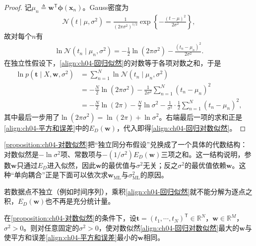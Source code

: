 \documentclass[../../main.tex]{subfiles}
\begin{document}
\begin{proof}
记$\mu_n\triangleq\boldsymbol{w}^{\mathsf{T}}\boldsymbol{\phi}(\boldsymbol{x}_n)$。Gauss密度为
\begin{align*}
  \mathcal{N}(t\mid\mu,\sigma^2)=\frac{1}{(2\pi\sigma^2)^{1/2}}\exp\left\{-\frac{(t-\mu)^2}{2\sigma^2}\right\},
\end{align*}
故对每个$n$有
\begin{align*}
  \ln\mathcal{N}(t_n\mid\mu_n,\sigma^2)=-\frac{1}{2}\ln(2\pi\sigma^2)-\frac{(t_n-\mu_n)^2}{2\sigma^2}.
\end{align*}
在独立性假设下，\eqref{align:ch04-回归似然}的对数等于各项对数之和，于是
\begin{align*}
  \ln p(\boldsymbol{t}\mid X,\boldsymbol{w},\sigma^2)
  &=\sum_{n=1}^{N}\ln\mathcal{N}(t_n\mid\mu_n,\sigma^2)\\
  &=-\frac{N}{2}\ln(2\pi\sigma^2)-\frac{1}{2\sigma^2}\sum_{n=1}^{N}(t_n-\mu_n)^2\\
  &=-\frac{N}{2}\ln(2\pi)-\frac{N}{2}\ln\sigma^2-\frac{1}{\sigma^2}\cdot\frac{1}{2}\sum_{n=1}^{N}(t_n-\mu_n)^2,
\end{align*}
其中最后一步用了$\ln(2\pi\sigma^2)=\ln(2\pi)+\ln\sigma^2$。右端最后一项的求和正是\eqref{align:ch04-平方和误差}中的$E_D(\boldsymbol{w})$，代入即得\eqref{align:ch04-回归对数似然}。
\end{proof}

\begin{remark}
\cref{proposition:ch04-对数似然}把“独立同分布假设”兑换成了一个具体的代数结构：对数似然是$-\ln\sigma^2$项、常数项与$-(1/\sigma^2)E_D(\boldsymbol{w})$三项之和。这一结构说明，参数$\boldsymbol{w}$只通过$E_D$进入似然，因此$\boldsymbol{w}$的最优值与$\sigma^2$无关；反之$\sigma^2$的最优值依赖$\boldsymbol{w}$。这种“单向耦合”正是下面可以依次求$\boldsymbol{w}_{\mathrm{ML}}$与$\sigma^2_{\mathrm{ML}}$的原因。

若数据点不独立（例如时间序列），乘积\eqref{align:ch04-回归似然}就不能分解为逐点之积，$E_D(\boldsymbol{w})$也不再是充分统计量。
\end{remark}

\begin{proposition}[最大似然等价于最小二乘]\label{proposition:ch04-最大似然与最小二乘}
在\cref{proposition:ch04-对数似然}的条件下，设$\boldsymbol{t}=(t_1,\cdots,t_N)^{\mathsf{T}}\in\mathbb{R}^{N}$，$\boldsymbol{w}\in\mathbb{R}^{M}$，$\sigma^{2}>0$。则对任意固定的$\sigma^2>0$，使对数似然\eqref{align:ch04-回归对数似然}最大的$\boldsymbol{w}$与使平方和误差\eqref{align:ch04-平方和误差}最小的$\boldsymbol{w}$相同。
\end{proposition}
\end{document}
